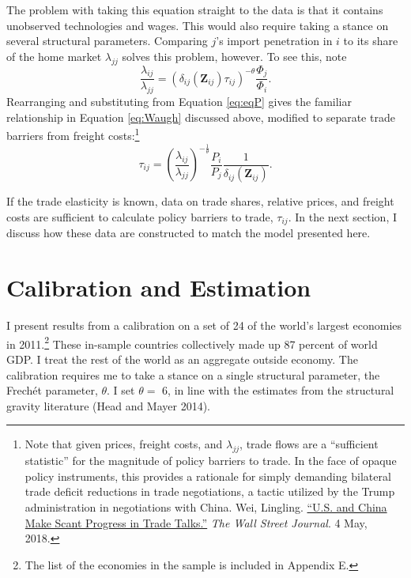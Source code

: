 \documentclass{puthesis}
\begin{document}
The problem with taking this equation straight to the data is that it
contains unobserved technologies and wages. This would also require
taking a stance on several structural parameters. Comparing \(j\)'s
import penetration in \(i\) to its share of the home market
\(\lambda_{jj}\) solves this problem, however. To see this, note \[
\frac{\lambda_{ij}}{\lambda_{jj}} = \left( \delta_{ij}(\bm{Z}_{ij}) \tau_{ij} \right)^{- \theta} \frac{\Phi_j}{\Phi_i} .
\] Rearranging and substituting from Equation \ref{eq:eqP} gives the
familiar relationship in Equation \ref{eq:Waugh} discussed above,
modified to separate trade barriers from freight costs:\footnote{Note
  that given prices, freight costs, and \(\lambda_{jj}\), trade flows
  are a ``sufficient statistic'' for the magnitude of policy barriers to
  trade. In the face of opaque policy instruments, this provides a
  rationale for simply demanding bilateral trade deficit reductions in
  trade negotiations, a tactic utilized by the Trump administration in
  negotiations with China. Wei, Lingling.
  \href{https://www.wsj.com/articles/u-s-wants-200-billion-cut-in-china-trade-imbalance-by-end-of-2020-1525419253}{``U.S.
  and China Make Scant Progress in Trade Talks.''} \emph{The Wall Street
  Journal}. 4 May, 2018.} \begin{equation} \label{eq:tau}
\tau_{ij} = \left( \frac{\lambda_{ij}}{\lambda_{jj}} \right)^{-\frac{1}{\theta}} \frac{P_i}{P_j} \frac{1}{\delta_{ij}(\bm{Z}_{ij})} .
\end{equation}

If the trade elasticity is known, data on trade shares, relative prices,
and freight costs are sufficient to calculate policy barriers to trade,
\(\tau_{ij}\). In the next section, I discuss how these data are
constructed to match the model presented here.

\section{Calibration and Estimation}

I present results from a calibration on a set of 24 of the world's
largest economies in 2011.\footnote{The list of the economies in the
  sample is included in Appendix E.} These in-sample countries
collectively made up 87 percent of world GDP. I treat the rest of the
world as an aggregate outside economy. The calibration requires me to
take a stance on a single structural parameter, the Frechét parameter,
\(\theta\). I set \(\theta =\) 6, in line with the estimates from the
structural gravity literature (Head and Mayer 2014).
\end{document}
